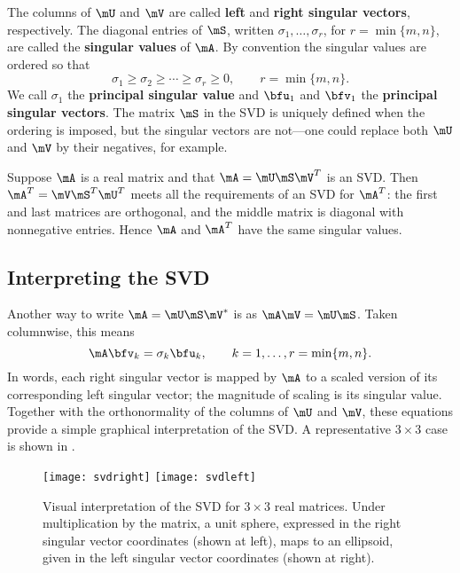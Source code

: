  The columns of $\mU$ and $\mV$ are called \textbf{left} and \textbf{right singular vectors}, respectively. The diagonal entries of $\mS$, written $\sigma_1,\ldots,\sigma_r$, for $r=\min\{m,n\}$, are called the  \textbf{singular values} of $\mA$. By convention the singular values are ordered so that
\begin{equation}
  \label{eq:svdorder}
  \sigma_1 \ge \sigma_2 \ge \cdots \ge \sigma_r\ge 0, \qquad r=\min\{m,n\}.
\end{equation}
We call $\sigma_1$ the  \textbf{principal singular value} and $\bfu_{1}$ and $\bfv_{1}$ the \textbf{principal singular vectors}. The matrix $\mS$ in the SVD is uniquely defined when the ordering is imposed, but the singular vectors are not---one could replace both $\mU$ and $\mV$ by their negatives, for example.

\begin{exam}
  Suppose $\mA$ is a real matrix and that $\mA=\mU\mS\mV^T$ is an SVD. Then $\mA^T=\mV\mS^T\mU^T$ meets all the requirements of an SVD for $\mA^T$: the first and last matrices are orthogonal, and the middle matrix is diagonal with nonnegative entries. Hence $\mA$ and $\mA^T$ have the same singular values.
\end{exam}

\subsection{Interpreting the SVD}

Another way to write $\mA=\mU\mS\mV^*$ is as $\mA\mV=\mU\mS$. Taken columnwise, this means
\begin{equation}
  \label{eq:svdcolumns}
  \mA \bfv_{k} = \sigma_k \bfu_{k}, \qquad k=1,\ldots,r=\min\{m,n\}.
\end{equation}
In words, each right singular vector is mapped by $\mA$ to a scaled version of its corresponding left singular vector; the magnitude of scaling is its singular value. Together with the orthonormality of the columns of $\mU$ and $\mV$, these equations provide a simple graphical interpretation of the SVD. A representative $3\times 3$ case is shown in .

\begin{figure}[tbp]
  \centering
  \texttt{[image: svdright]}
  \hspace{8mm}
  \texttt{[image: svdleft]}
  \caption{Visual interpretation of the SVD for $3\times 3$ real matrices. Under multiplication by the matrix, a unit sphere, expressed in the right singular vector coordinates (shown at left), maps to an ellipsoid, given in the left singular vector coordinates (shown at right).}
  \label{fig:svdvisual}
\end{figure}

